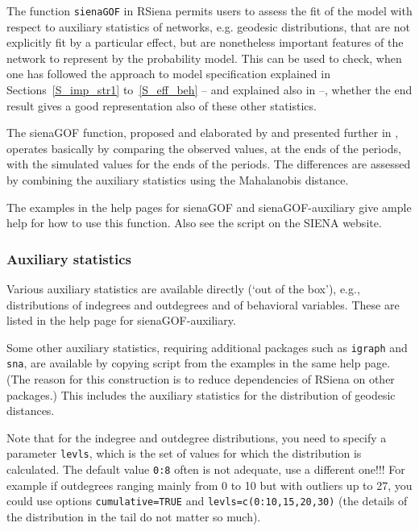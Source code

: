 \documentclass[a4paper,fleqn,11pt]{article}
\newcommand{\+}{\, + \,}
\newcommand{\sfn}[1]{\textsf{#1}}
\newcommand{\RS}{{\sf \textsf{RSiena} }}
\newcommand{\SI}{{\sf SIENA }}
\begin{document}
The function  \verb!sienaGOF! in \RS permits users
to assess the fit of the model with respect to
auxiliary statistics of networks, e.g. geodesic distributions,
that are not explicitly fit by a particular effect,
but are nonetheless important features of the network to represent by the
probability model.
This can be used to check, when one has followed the approach to
model specification explained in Sections~\ref{S_imp_str1}
to~\ref{S_eff_beh} -- and explained also in \citet{SnijdersEA10b} --,
whether the end result gives a good representation
also of these other statistics.

The \textsf{sienaGOF} function, proposed and elaborated by
\citet{Lospinoso2012} and presented further
in \citet{LospinosoSnijders2019}, operates basically by comparing
the observed values, at the ends of the periods, with the
simulated values for the ends of the periods.
The differences are assessed by combining the auxiliary statistics
using the Mahalanobis distance.

The examples in the help pages for \textsf{sienaGOF} and \sfn{sienaGOF-auxiliary}
give ample help for how to use this function.
Also see the script on the \SI website.


\subsubsection{Auxiliary statistics}

Various auxiliary statistics are available directly (`out of the box'),
e.g., distributions of indegrees and outdegrees and of behavioral
variables. These are listed in the help page for
 \sfn{sienaGOF-auxiliary}.

Some other auxiliary statistics, requiring
additional packages such as \texttt{igraph} and \texttt{sna},
are available by copying script from the examples in the same help page.
(The reason for this construction is to reduce dependencies
of \RS on other packages.) This includes the auxiliary statistics
for the distribution of geodesic distances.

Note that for the indegree and outdegree distributions, you need
to specify a parameter \texttt{levls}, which is the set of values
for which the distribution is calculated.
The default value \texttt{0:8} often is not adequate, use a different one!!!
For example if outdegrees ranging mainly from 0 to 10 but with outliers up to 27,
you could use options \texttt{cumulative=TRUE} and \texttt{levls=c(0:10,15,20,30)}
(the details of the distribution in the tail do not matter so much).
\end{document}
